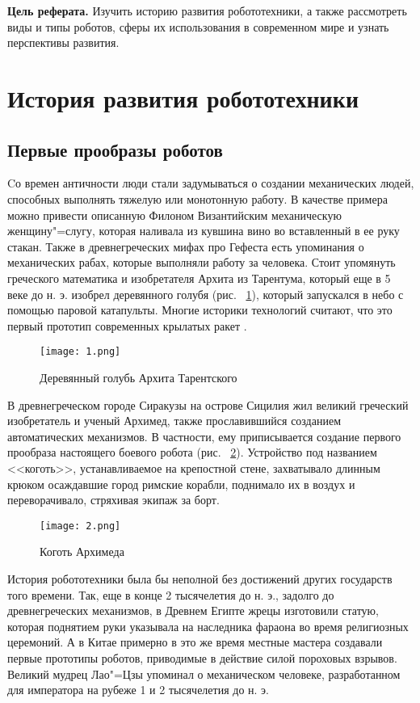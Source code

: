 \documentclass[bachelor, och, referat]{SCWorks}
\begin{document}
\textbf{Цель реферата.} Изучить историю развития робототехники, а также рассмотреть виды и типы роботов, сферы их использования в современном мире и узнать перспективы развития.

\section{История развития робототехники}

\subsection{Первые прообразы роботов}

Cо времен античности люди стали задумываться о создании механических людей,
способных выполнять тяжелую или монотонную работу.  В качестве примера можно
привести описанную Филоном Византийским механическую женщину"=слугу, которая
наливала из кувшина вино во вставленный в ее руку стакан. Также в
древнегреческих мифах про Гефеста есть упоминания о механических рабах, которые
выполняли работу за человека. Стоит упомянуть греческого математика и
изобретателя Архита из Тарентума, который еще в 5 веке до н. э. изобрел
деревянного голубя (рис. ~\ref{fig:1}), который запускался в небо с помощью
паровой катапульты. Многие историки технологий считают, что это первый прототип
современных крылатых ракет \cite{1}. 

\begin{figure}[h!]
    \centering
    \texttt{[image: 1.png]}
    \caption{\label{fig:1}%
    Деревянный голубь Архита Тарентского}
\end{figure}

В древнегреческом городе Сиракузы на острове Сицилия жил великий греческий
 изобретатель и ученый Архимед, также прославившийся созданием автоматических
 механизмов. В частности, ему приписывается создание первого прообраза
 настоящего боевого робота (рис. ~\ref{fig:2}). Устройство под названием
 <<коготь>>, устанавливаемое на крепостной стене, захватывало длинным крюком
 осаждавшие город римские корабли, поднимало их в воздух и переворачивало,
 стряхивая экипаж за борт.
\begin{figure}[h!]
    \centering
    \texttt{[image: 2.png]}
    \caption{\label{fig:2}%
    Коготь Архимеда}
\end{figure}

\vspace{5cm}

 История робототехники была бы неполной без достижений других государств того
 времени. Так, еще в конце 2 тысячелетия до н. э., задолго до древнегреческих
 механизмов, в Древнем Египте жрецы изготовили статую, которая поднятием руки
 указывала на наследника фараона во время религиозных церемоний. А в Китае
 примерно в это же время местные мастера создавали первые прототипы роботов,
 приводимые в действие силой пороховых взрывов. Великий мудрец Лао"=Цзы упоминал
 о механическом человеке, разработанном для императора на рубеже 1 и 2
 тысячелетия до н. э.
\end{document}
